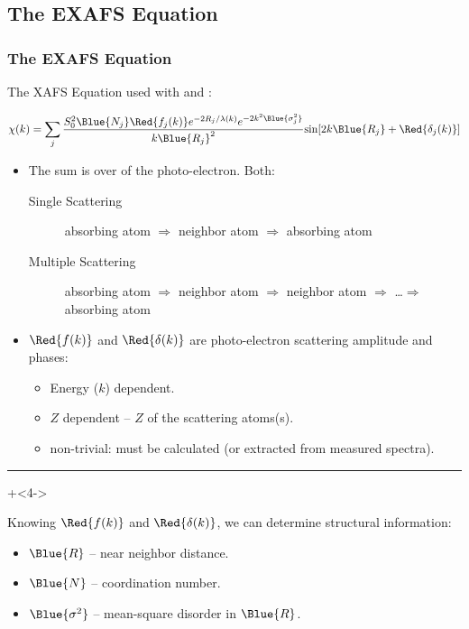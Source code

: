 
\subsection{The EXAFS Equation}
\begin{frame}
  \frametitle{The EXAFS Equation} %

  The XAFS Equation used with {\feff} and {\larch}:

  \[
  \chi(k) = \sum_j {{ S_0^2 {\Blue{N_j}} {\Red{f_j(k)}}  e^{-2R_j/\lambda(k)}
      e^{-2k^2{\Blue{\sigma_j^2}}}}\over{k{\Blue{R_j}}^2}}
  {\sin[{2k{\Blue{R_j}} + {\Red{\delta_j(k)}}} ]}
   \]

\begin{itemize}
   \pause
     \item  The sum is over  {} of the
       photo-electron.   Both:

       \begin{description}

       \item[Single Scattering] {\tiny{ absorbing atom $\Rightarrow$ neighbor atom
             $\Rightarrow$ absorbing atom}}


       \item[Multiple Scattering] {\tiny{absorbing atom $\Rightarrow$ neighbor
             atom  $\Rightarrow$ neighbor atom $\Rightarrow$ \ldots  $\Rightarrow$
             absorbing atom}}

       \end{description}

       \pause\item $\Red{f(k)}$ and $\Red{\delta(k)}$ are
       {{photo-electron scattering amplitude and phases}}:

   \begin{itemize}
   \item Energy ($k$) dependent.
   \item $Z$ dependent -- $Z$ of the scattering atoms(s).
   \item non-trivial: must be calculated (or extracted from measured spectra).

   \end{itemize}
 \end{itemize}

   \vmm \hrule \vmm

   \onslide+<4->

   Knowing  $\Red{f(k)}$ and $\Red{\delta(k)}$, we can determine structural information:

     \begin{itemize}
     \item ${\Blue{R}}$ --  near neighbor distance.
     \item ${\Blue{N}}$ -- coordination number.
     \item ${\Blue{\sigma^2}}$ -- mean-square  disorder in ${\Blue{R}}$.
     \end{itemize}

   \vmm

\end{frame}
